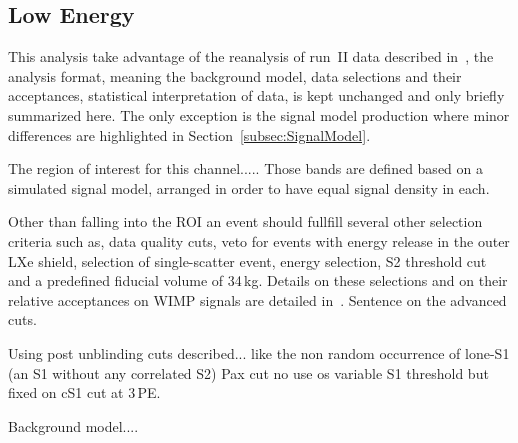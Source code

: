 
\subsection{Low Energy}
\label{subsec:LowE}
This analysis take advantage of the reanalysis of run~II data described in~\cite{xe100_run_combination}, the analysis format, meaning the background model, data selections and their acceptances, 
statistical interpretation of data, is kept unchanged and only briefly summarized here. The only exception is the signal model production where 
minor differences are highlighted in Section~\ref{subsec:SignalModel}.

The region of interest for this channel.....
Those bands are defined based on a simulated signal model, arranged in order to have equal signal density in each.

Other than falling into the ROI an event should fullfill several other selection criteria such as, data quality cuts,
veto for events with energy release in the outer LXe shield, selection of single-scatter event, energy selection, S2 threshold cut and 
a predefined fiducial volume of 34\,kg. Details on these selections and on their relative acceptances on WIMP signals are detailed in~\cite{Aprile:2012vw}. 
Sentence on the advanced cuts.

Using post unblinding cuts described... like the non random occurrence of lone-S1 (an S1 without any correlated S2)
Pax cut
no use os variable S1 threshold but fixed on cS1 cut at 3\,PE.

Background model....


